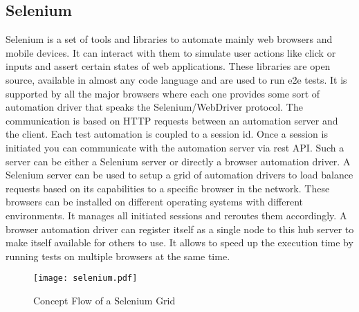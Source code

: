 \subsection{Selenium\label{sec:history}}

Selenium is a set of tools and libraries to automate mainly web browsers and mobile devices. It can interact with them to simulate user actions like click or inputs and assert certain states of web applications. These libraries are open source, available in almost any code language and are used to run e2e tests. It is supported by all the major browsers where each one provides some sort of automation driver that speaks the Selenium/WebDriver protocol. The communication is based on HTTP requests between an automation server and the client. Each test automation is coupled to a session id. Once a session is initiated you can communicate with the automation server via rest API. Such a server can be either a Selenium server or directly a browser automation driver. A Selenium server can be used to setup a grid of automation drivers to load balance requests based on its capabilities to a specific browser in the network. These browsers can be installed on different operating systems with different environments. It manages all initiated sessions and reroutes them accordingly. A browser automation driver can register itself as a single node to this hub server to make itself available for others to use. It allows to speed up the execution time by running tests on multiple browsers at the same time.

\begin{figure}[htb]
  \centering
  \texttt{[image: selenium.pdf]}\\
  \caption{Concept Flow of a Selenium Grid}\label{fig:selenium}
\end{figure}


